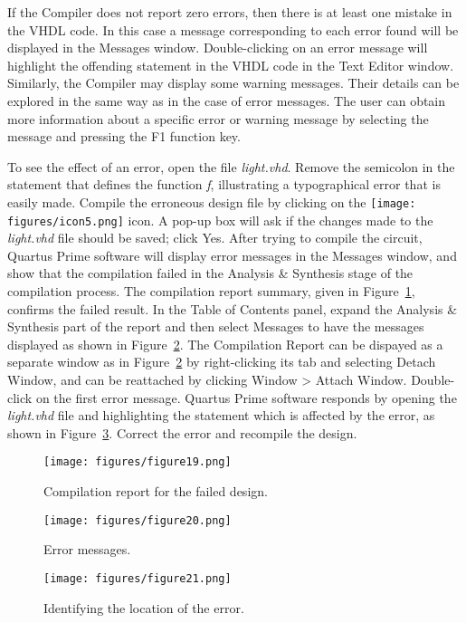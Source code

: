 If the Compiler does not report zero errors, then there is at least one mistake 
in the VHDL code. In this case a
message corresponding to each error found will
be displayed in the Messages window.
Double-clicking on an error message will highlight the offending
statement in the VHDL code in the Text Editor window. 
Similarly, the Compiler may display some warning messages. Their details can be
explored in the same way as in the case of error messages.
The user can obtain more information about a specific error or warning message
by selecting the message and pressing the {\sf F1} function key.

To see the effect of an error, open the file {\it light.vhd}.
Remove the semicolon in the statement that defines the function {\it f}, illustrating a
typographical error that is easily made.
Compile the erroneous design file by clicking on the \texttt{[image: figures/icon5.png]} icon.
A pop-up box will ask if the changes made to the {\it light.vhd} file should be saved;
click {\sf Yes}. After trying to compile the circuit,
Quartus Prime software will display error messages in the Messages window, and 
show that the compilation failed in the {\sf Analysis \& Synthesis} stage of the compilation process.
The compilation report summary, given in Figure~\ref{fig:19}, 
confirms the failed result. In the Table of Contents panel, expand the {\sf Analysis \& Synthesis} part of the report
and then select {\sf Messages} to have the messages displayed as shown in Figure~\ref{fig:20}.
The Compilation Report can be dispayed as a separate window as in Figure~\ref{fig:20} 
by right-clicking its tab and selecting {\sf Detach Window}, and can be reattached by clicking
{\sf Window > Attach Window}.
Double-click on the first error message. 
Quartus Prime software responds by opening the {\it light.vhd}
file and highlighting the statement which is affected by the error,
as shown in Figure~\ref{fig:21}.
Correct the error and recompile the design.

\begin{figure}[H]
   \begin{center}
      \texttt{[image: figures/figure19.png]}
   \caption{Compilation report for the failed design.} 
	 \label{fig:19}
	 \end{center}
\end{figure}

\begin{figure}[H]
   \begin{center}
      \texttt{[image: figures/figure20.png]}
   \caption{Error messages.}
	 \label{fig:20}
	 \end{center}
\end{figure}

\begin{figure}[H]
   \begin{center}
      \texttt{[image: figures/figure21.png]}
   \caption{Identifying the location of the error.} 
	 \label{fig:21}
	 \end{center}
\end{figure}
